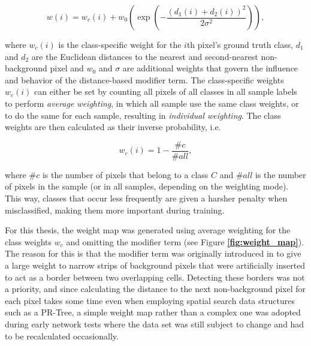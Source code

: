 \[ w(i) = w_c(i) + w_0 \left ( \exp \left (- \frac{(d_1(i) + d_2(i))^2}{2\sigma^2} \right ) \right ), \]

\noindent where $w_c(i)$ is the class-specific weight for the $i$th pixel's ground truth class, $d_1$ and $d_2$ are the Euclidean distances to the nearest and second-nearest non-background pixel and $w_0$ and $\sigma$ are additional weights that govern the influence and behavior of the distance-based modifier term. The class-specific weights $w_c(i)$ can either be set by counting all pixels of all classes in all sample labels to perform \textit{average weighting}, in which all sample use the same class weights, or to do the same for each sample, resulting in \textit{individual weighting}. The class weights are then calculated as their inverse probability, i.e.

\[ w_c(i) = 1 - \frac{\#c}{\#all}, \]

\noindent where $\#c$ is the number of pixels that belong to a class $C$ and $\#all$ is the number of pixels in the sample (or in all samples, depending on the weighting mode). This way, classes that occur less frequently are given a harsher penalty when misclassified, making them more important during training.

For this thesis, the weight map was generated using average weighting for the class weights $w_c$ and omitting the modifier term (see Figure \textbf{\ref{fig:weight_map}}). The reason for this is that the modifier term was originally introduced in \cite{unet} to give a large weight to narrow strips of background pixels that were artificially inserted to act as a border between two overlapping cells. Detecting these borders was not a priority, and since calculating the distance to the next non-background pixel for each pixel takes some time even when employing spatial search data structures such as a PR-Tree,  a simple weight map rather than a complex one was adopted during early network tests where the data set was still subject to change and had to be recalculated occasionally.\\

